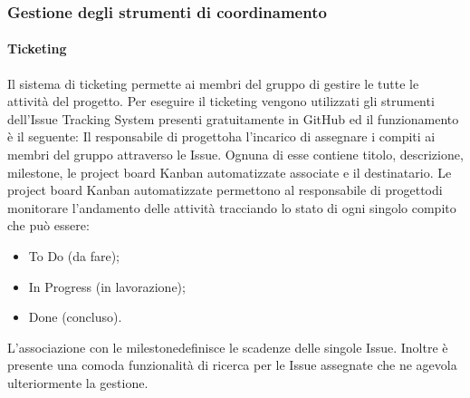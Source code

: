 		\subsubsection{Gestione degli strumenti di coordinamento}
			\paragraph*{Ticketing}
				Il sistema di ticketing permette ai membri del gruppo di gestire le tutte le attività del progetto\glo.
				Per eseguire il ticketing vengono utilizzati gli strumenti dell'Issue Tracking System presenti gratuitamente in GitHub ed il funzionamento è il seguente:
				Il responsabile di progetto\glosp ha l'incarico di assegnare i compiti ai membri del gruppo attraverso le Issue. Ognuna di esse contiene titolo, descrizione, milestone\glo, le project board Kanban automatizzate associate e il destinatario.
				Le project board Kanban automatizzate permettono al responsabile di progetto\glosp di monitorare l'andamento delle attività tracciando lo stato di ogni singolo compito che può essere:
				\begin{itemize}
					\item To Do (da fare);
					\item In Progress (in lavorazione);
					\item Done (concluso).
				\end{itemize}
				L'associazione con le milestone\glosp definisce le scadenze delle singole Issue.
				Inoltre è presente una comoda funzionalità di ricerca per le Issue assegnate che ne agevola ulteriormente la gestione.

